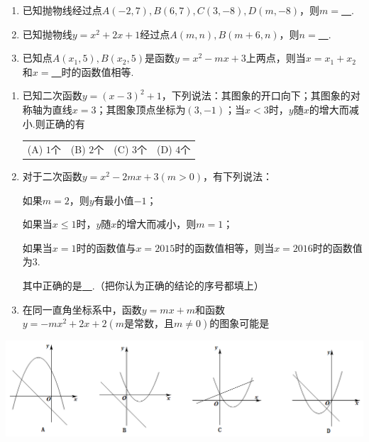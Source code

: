\documentclass[10pt]{ctexart}
\newcommand{\onech}[4]{
\renewcommand\arraystretch{1.4}
\begin{tabularx}{\linewidth}{XXXX}
\setlength\tabcolsep{0pt}
(A) #1 & (B) #2 & (C) #3 & (D) #4 \\
\end{tabularx}
\unskip \unskip}
\begin{document}
\begin{jply}{}{}
   \begin{enumerate}[(1)]
   \item 已知抛物线经过点$A(-2,7),B(6,7),C(3,-8),D(m,-8)$，则$m=$\underline{~\hspace{1cm}~}.
   \item 已知抛物线$y=x^2+2x+1$经过点$A(m,n),B(m+6,n)$，则$n=$\underline{~\hspace{1cm}~}.
   \item 已知点$A(x_1,5),B(x_2,5)$是函数$y=x^2-mx+3$上两点，则当$x=x_1+x_2$和$x=$\underline{~\hspace{1cm}~}时的函数值相等.
   \end{enumerate}
\end{jply}
\begin{jply}{}{}
   \begin{enumerate}[(1)]
   \item 已知二次函数$y=(x-3)^2+1$，下列说法：其图象的开口向下；其图象的对称轴为直线$x=3$；其图象顶点坐标为$(3,-1)$；当$x<3$时，$y$随$x$的增大而减小.则正确的有
   
   \onech{$1$个}{$2$个}{$3$个}{$4$个}
   
   \item 对于二次函数$y=x^2-2mx+3(m>0)$，有下列说法：
   
   如果$m=2$，则$y$有最小值$-1$；
   
   如果当$x\leqslant 1$时，$y$随$x$的增大而减小，则$m=1$；
   
   如果当$x=1$时的函数值与$x=2015$时的函数值相等，则当$x=2016$时的函数值为$3$.
   
   其中正确的是\underline{~\hspace{1cm}~}.（把你认为正确的结论的序号都填上）
   \item 在同一直角坐标系中，函数$y=mx+m$和函数$y=-mx^2+2x+2(m\text{是常数，且}m\neq 0)$的图象可能是
   \end{enumerate}
\end{jply}

\includegraphics[scale=0.6]{figure/g-3.PNG} 
\end{document}
